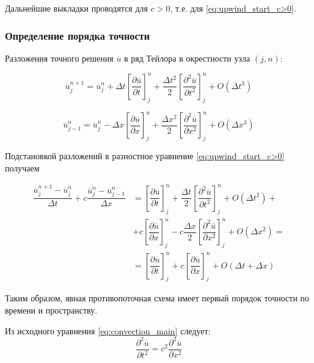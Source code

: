 Дальнейшие выкладки проводятся для $c>0$, т.е. для \eqref{eq:upwind_start_c>0}.

\subsubsection{Определение порядка точности}
Разложения точного решения $\overline{u}$ в ряд Тейлора в окрестности узла $(j, n)$:


\begin{equation*}
	\overline{u}_j^{n+1} = \overline{u}_j^n + \Delta t \left[ \dfrac{\partial \overline{u}}{\partial t} \right]_j^n + \dfrac{\Delta t^2}{2} \left[ \dfrac{\partial^2 \overline{u}}{\partial t^2} \right]_j^n + O(\Delta t^3)
\end{equation*}

\begin{equation*}
	\overline{u}_{j-1}^n = \overline{u}_j^n - \Delta x \left[ \dfrac{\partial \overline{u}}{\partial x} \right]_j^n + \dfrac{\Delta x^2}{2} \left[ \dfrac{\partial^2 \overline{u}}{\partial x^2} \right]_j^n + O(\Delta x^3)
\end{equation*}


Подстановкой разложений в разностное уравнение \eqref{eq:upwind_start_c>0} получаем

\begin{equation} \label{upwind_du/dt}
	\begin{split}
		\dfrac{\overline{u}_j^{n+1} - \overline{u}_j^n}{\Delta t} + c \dfrac{\overline{u}_j^{n} - \overline{u}_{j-1}^n}{\Delta x} &=
		\left[ \dfrac{\partial \overline{u}}{\partial t} \right]_j^n + \dfrac{\Delta t}{2} \left[ \dfrac{\partial^2 \overline{u}}{\partial t^2} \right]_j^n +
		O(\Delta t^2) + \\
		&+  
		c \left[ \dfrac{\partial \overline{u}}{\partial x} \right]_j^n - c \dfrac{\Delta x}{2} \left[ \dfrac{\partial^2 \overline{u}}{\partial x^2} \right]_j^n + O(\Delta x^2) = \\
		&= \left[ \dfrac{\partial \overline{u}}{\partial t} \right]_j^n + c \left[ \dfrac{\partial \overline{u}}{\partial x} \right]_j^n + O(\Delta t + \Delta x)
	\end{split}
\end{equation}

Таким образом, явная противопоточная схема имеет первый порядок точности по времени и пространству.

Из исходного уравнения \eqref{eq:convection_main} следует:
\begin{equation} \label{convection_consequence}
	\dfrac{\partial^2 \overline{u}}{\partial t^2} = c^2 \dfrac{\partial^2 \overline{u}}{\partial x^2}
\end{equation}

